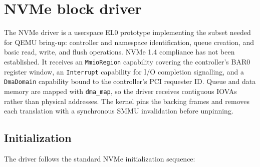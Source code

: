 \begin{center}
\end{center}

\section{NVMe block driver}

The NVMe driver is a userspace EL0 prototype implementing the subset needed for
QEMU bring-up: controller and namespace identification, queue creation, and
basic read, write, and flush operations. NVMe 1.4 compliance has not been
established. It receives an \texttt{MmioRegion} capability covering the controller's
BAR0 register window, an \texttt{Interrupt} capability for I/O
completion signalling, and a \texttt{DmaDomain} capability bound to the
controller's PCI requester ID. Queue and data memory are mapped with
\texttt{dma\_map}, so the driver receives contiguous IOVAs rather than physical
addresses. The kernel pins the backing frames and removes each translation
with a synchronous SMMU invalidation before unpinning.

\subsection{Initialization}

The driver follows the standard NVMe initialization sequence:

